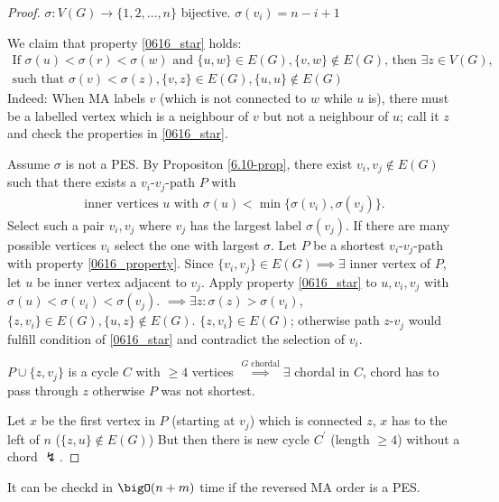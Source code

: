 \documentclass[aagt.tex]{subfiles}
\begin{document}
\begin{proof}
  $\sigma: V(G)  \to \{1,2,\dots,n\}$ bijective. $\sigma(v_i) = n-i+1$
  
  We claim that property \ref{0616_star} holds:
  \begin{align}\label{0616_star}
    \text{If } \sigma(u) < \sigma(r) < \sigma(w) \text{ and } \{u,w \} \in E(G), \{v,w\} \notin E(G) \text{, then } \exists z \in V(G), \\
    \text{such that } \sigma(v) < \sigma(z), \{v,z\} \in E(G), \{u,u\} \notin E(G)
  \end{align}
  Indeed: When MA labels $v$ (which is not connected to $w$ while $u$ is), there must be a labelled vertex which is a neighbour of $v$ but not a neighbour of $u$; call it $z$ and check the properties in \ref{0616_star}.
  
  Assume $\sigma$ is not a PES. By Propositon \ref{6.10-prop}, there exist $v_i,v_j \notin E(G)$ such that there exists a $v_i$-$v_j$-path $P$ with 
  \begin{align} \label{0616_property}
    \text{inner vertices } u \text{ with } \sigma(u) < \min \{\sigma(v_i),\sigma(v_j)\} \text{.}
  \end{align}
  Select such a pair $v_i,v_j$ where $v_j$ has the largest label $\sigma(v_j)$.
  If there are many possible vertices $v_i$ select the one with largest $\sigma$.
  Let $P$ be a shortest $v_i$-$v_j$-path with property \ref{0616_property}.
  Since $\{v_i,v_j\} \in E(G) \implies \exists$ inner vertex of $P$, let $u$ be inner vertex adjacent to $v_j$.
  Apply property \ref{0616_star} to $u,v_i,v_j$ with $\sigma(u) < \sigma(v_i) < \sigma(v_j)$.
  $\implies \exists z: \sigma(z) > \sigma(v_i)$, $\{z,v_i\} \in E(G), \{u,z\}\notin E(G)$.
  $\{z,v_i\} \in E(G)$; otherwise path $z$-$v_j$ would fulfill condition of \ref{0616_star} and contradict the selection of $v_i$.
  
  $P \cup \{z,v_j\}$ is a cycle $C$ with $\geq 4$ vertices $\overset{G \text{ chordal}}{\implies} \exists$ chordal in $C$, chord has to pass through $z$ otherwise $P$ was not shortest.
  
  Let $x$ be the first vertex in $P$ (starting at $v_j$) which is connected $z$, $x$ has to the left of $n$ ($\{z,u\} \notin E(G)$)
  But then there is new cycle $C^\prime$ (length $\geq 4$) without a chord $\lightning$.
\end{proof}

\begin{theorem}
  It can be checkd in $\bigO(n + m)$ time if the reversed MA order is a PES.
\end{theorem}
\end{document}
